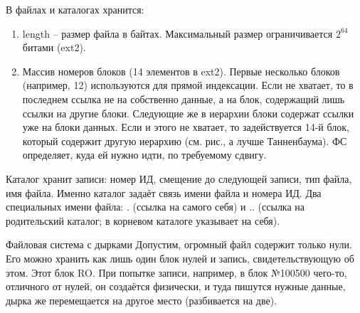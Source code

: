 \documentclass[a4paper,10pt]{article}
\begin{document}
В файлах и каталогах хранится:
\begin{enumerate}
\item length -- размер файла в байтах. Максимальный размер ограничивается $2^64$ битами (ext2).
\item Массив номеров блоков (14 элементов в ext2). Первые несколько блоков (например, 12) используются для прямой индексации.
Если не хватает, то в последнем ссылка не на собственно данные, а на блок, содержащий лишь ссылки на другие блоки. Следующие же в иерархии блоки содержат ссылки уже на блоки данных. 
Если и этого не хватает, то задействуется 14-й блок, который содержит другую иерархию (см. рис., а лучше Танненбаума).
ФС определяет, куда ей нужно идти, по требуемому сдвигу.
\end{enumerate}

Каталог хранит записи:
номер ИД, смещение до следующей записи, тип файла, имя файла. Именно каталог задаёт связь имени файла и номера ИД.
Два специальных имени файла: . (ссылка на самого себя) и .. (ссылка на родительский каталог; в корневом каталоге указывает на себя).

Файловая система с дырками
Допустим, огромный файл содержит только нули. Его можно хранить как лишь один блок нулей и запись, свидетельствующую об этом. Этот блок RO. При попытке записи, например, в блок №100500 чего-то, отличного от нулей, он создаётся физически, и туда пишутся нужные данные, дырка же перемещается на другое место (разбивается на две).
\end{document}
